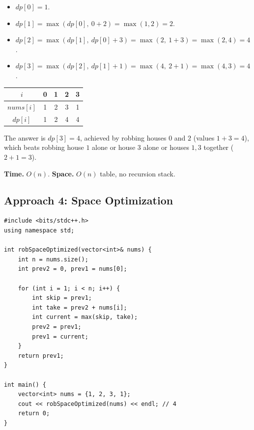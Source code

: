 
\begin{itemize}
  \item $\textit{dp}[0] = 1$.
  \item $\textit{dp}[1] = \max(\textit{dp}[0],\ 0+2) = \max(1,2) = 2$.
  \item $\textit{dp}[2] = \max(\textit{dp}[1],\ \textit{dp}[0]+3) =
        \max(2,\ 1+3) = \max(2,4) = 4$.
  \item $\textit{dp}[3] = \max(\textit{dp}[2],\ \textit{dp}[1]+1) =
        \max(4,\ 2+1) = \max(4,3) = 4$.
\end{itemize}

\begin{center}
\begin{tabular}{c|c|c|c|c}
$i$ & 0 & 1 & 2 & 3 \\ \hline
$\textit{nums}[i]$ & 1 & 2 & 3 & 1 \\ \hline
$\textit{dp}[i]$ & 1 & 2 & 4 & 4
\end{tabular}
\end{center}

The answer is $\textit{dp}[3]=4$, achieved by robbing houses $0$ and
$2$ (values $1+3=4$), which beats robbing house $1$ alone or house $3$
alone or houses $1,3$ together ($2+1=3$).

\begin{complexitybox}
\textbf{Time.} $O(n)$.
\textbf{Space.} $O(n)$ table, no recursion stack.
\end{complexitybox}

\subsection*{Approach 4: Space Optimization}

\begin{lstlisting}
#include <bits/stdc++.h>
using namespace std;

int robSpaceOptimized(vector<int>& nums) {
    int n = nums.size();
    int prev2 = 0, prev1 = nums[0];

    for (int i = 1; i < n; i++) {
        int skip = prev1;
        int take = prev2 + nums[i];
        int current = max(skip, take);
        prev2 = prev1;
        prev1 = current;
    }
    return prev1;
}

int main() {
    vector<int> nums = {1, 2, 3, 1};
    cout << robSpaceOptimized(nums) << endl; // 4
    return 0;
}
\end{lstlisting}

